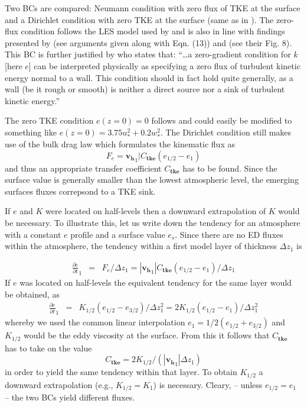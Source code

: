 \documentclass[dvipdfmx,a4paper,10pt]{article}
\begin{document}
Two BCs are compared: Neumann condition with zero flux of TKE at the surface and a Dirichlet condition with zero TKE at the surface (same as in \cite{teixeira04}). The zero-flux condition follows the LES model used by \cite{deardorff74} and is also in line with findings presented by \cite{mcbean75} (see arguments given along with Eqn. (13)) and \cite{lenschow74} (see their Fig. 8). This BC is further justified by \cite{fuhrmann10} who states that:  ``\dots a zero-gradient condition for $k$ [here $e$] can be interpreted physically as specifying a zero flux of turbulent kinetic energy normal to a wall. This condition should in fact hold quite generally, as a wall (be it rough or smooth) is neither a direct source nor a sink of turbulent kinetic energy.''

The zero TKE condition $e(z=0)=0$ follows \cite{teixeira04} and could easily be modified to something like  $e(z=0)=3.75 u_*^2+0.2w_*^2$. The Dirichlet condition still makes use of the bulk drag law which formulates the kinematic flux as 
\begin{equation}
 F_e=\mathbf{v_h}_1| C_{\mathbf{tke}} (e_{1/2}-e_1)
\end{equation}
and thus an appropriate transfer coefficient $C_{\mathbf{tke}}$ has to be found. Since the surface value is generally smaller than the lowest atmospheric level, the emerging surfaces fluxes correpsond to a TKE sink. 

If $e$ and $K$ were located on half-levels then a downward extrapolation of $K$ would be necessary. To illustrate this, let us write down the tendency for an atmosphere with a constant $e$ profile and a surface value $e_s$. Since there are no ED fluxes within the atmosphere, the tendency within a first model layer of thickness $\Delta z_1$ is 

\begin{eqnarray}
 \frac{\partial e}{\partial t}_1 &=& F_e/\Delta z_1=|\mathbf{v_h}_1| C_{\mathbf{tke}} (e_{1/2}-e_1)/\Delta z_1
\end{eqnarray}
If $e$ was located on half-levels the equivalent tendency for the same layer would be obtained, as
\begin{eqnarray}
 \frac{\partial e}{\partial t}_1 &=& K_{1/2} (e_{1/2}-e_{3/2})/\Delta z_1^2= 2 K_{1/2} (e_{1/2}-e_{1})/\Delta z_1^2 
\end{eqnarray}
whereby we used the common linear interpolation $e_{1}=1/2(e_{1/2}+e_{3/2})$ and $K_{1/2}$ would be the eddy viscosity at the surface. From this it follows that $C_{\mathbf{tke}}$ has to take on the value 
\begin{equation}
 C_{\mathbf{tke}}= 2 K_{1/2}/ (|\mathbf{v_h}_1|  \Delta z_1)
\end{equation}
in order to yield the same tendency within that layer. To obtain $K_{1/2}$ a downward extrapolation (e.g., $K_{1/2}=K_{1}$) is necessary. Cleary, -- unless $e_{1/2}=e_{1}$ -- the two BCs yield different fluxes. 
\end{document}

